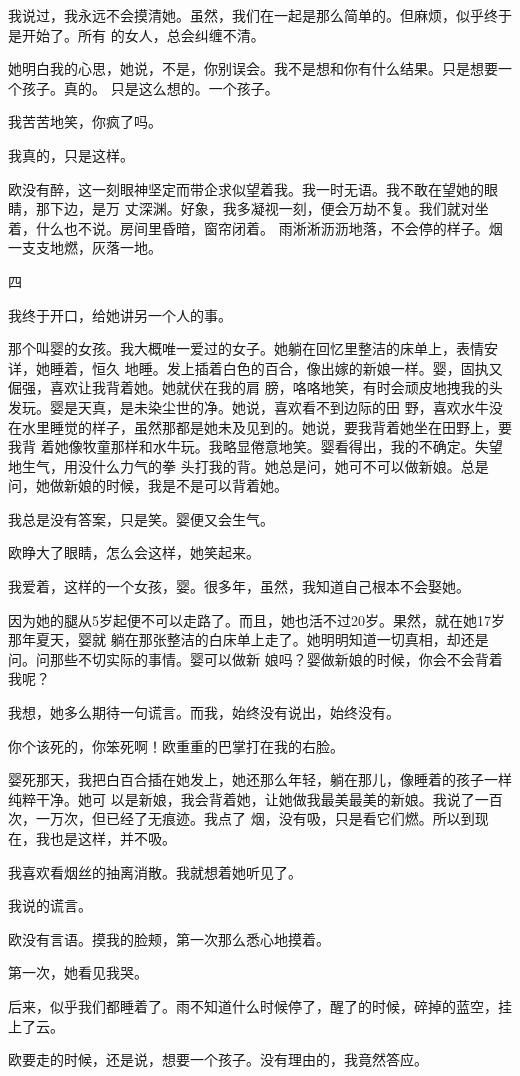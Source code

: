 \documentclass[12pt,a4paper]{article}
\newcommand{\subpart}[1]{
	\begingroup \par
	\vspace{1ex} \centering #1
	\par \endgroup
}
\begin{document}
		我说过，我永远不会摸清她。虽然，我们在一起是那么简单的。但麻烦，似乎终于是开始了。所有
	的女人，总会纠缠不清。

		她明白我的心思，她说，不是，你别误会。我不是想和你有什么结果。只是想要一个孩子。真的。
	只是这么想的。一个孩子。

		我苦苦地笑，你疯了吗。\par
		我真的，只是这样。

		欧没有醉，这一刻眼神坚定而带企求似望着我。我一时无语。我不敢在望她的眼睛，那下边，是万
	丈深渊。好象，我多凝视一刻，便会万劫不复。我们就对坐着，什么也不说。房间里昏暗，窗帘闭着。
	雨淅淅沥沥地落，不会停的样子。烟一支支地燃，灰落一地。

		\subpart{四}

		我终于开口，给她讲另一个人的事。

		那个叫婴的女孩。我大概唯一爱过的女子。她躺在回忆里整洁的床单上，表情安详，她睡着，恒久
	地睡。发上插着白色的百合，像出嫁的新娘一样。婴，固执又倔强，喜欢让我背着她。她就伏在我的肩
	膀，咯咯地笑，有时会顽皮地拽我的头发玩。婴是天真，是未染尘世的净。她说，喜欢看不到边际的田
	野，喜欢水牛没在水里睡觉的样子，虽然那都是她未及见到的。她说，要我背着她坐在田野上，要我背
	着她像牧童那样和水牛玩。我略显倦意地笑。婴看得出，我的不确定。失望地生气，用没什么力气的拳
	头打我的背。她总是问，她可不可以做新娘。总是问，她做新娘的时候，我是不是可以背着她。

		我总是没有答案，只是笑。婴便又会生气。\par
		欧睁大了眼睛，怎么会这样，她笑起来。\par
		我爱着，这样的一个女孩，婴。很多年，虽然，我知道自己根本不会娶她。

		因为她的腿从5岁起便不可以走路了。而且，她也活不过20岁。果然，就在她17岁那年夏天，婴就
	躺在那张整洁的白床单上走了。她明明知道一切真相，却还是问。问那些不切实际的事情。婴可以做新
	娘吗？婴做新娘的时候，你会不会背着我呢？

		我想，她多么期待一句谎言。而我，始终没有说出，始终没有。\par
		你个该死的，你笨死啊！欧重重的巴掌打在我的右脸。

		婴死那天，我把白百合插在她发上，她还那么年轻，躺在那儿，像睡着的孩子一样纯粹干净。她可
	以是新娘，我会背着她，让她做我最美最美的新娘。我说了一百次，一万次，但已经了无痕迹。我点了
	烟，没有吸，只是看它们燃。所以到现在，我也是这样，并不吸。

		我喜欢看烟丝的抽离消散。我就想着她听见了。\par
		我说的谎言。\par
		欧没有言语。摸我的脸颊，第一次那么悉心地摸着。\par
		第一次，她看见我哭。\par
		后来，似乎我们都睡着了。雨不知道什么时候停了，醒了的时候，碎掉的蓝空，挂上了云。\par
		欧要走的时候，还是说，想要一个孩子。没有理由的，我竟然答应。
\end{document}
